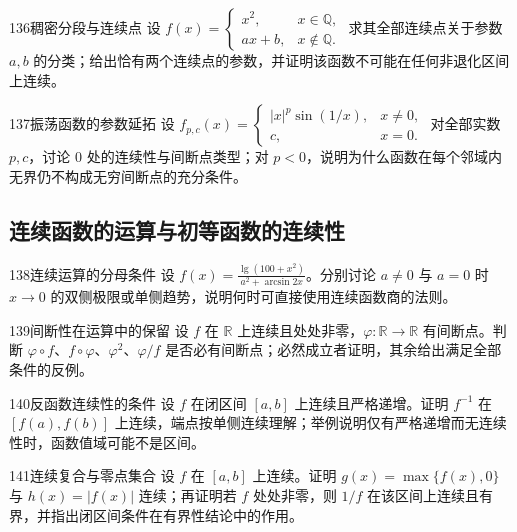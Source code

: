 \begin{exercise}{136}{稠密分段与连续点}
设 $f(x)=\begin{cases}x^2,&x\in\mathbb Q,\\ax+b,&x\notin\mathbb Q.\end{cases}$ 求其全部连续点关于参数 $a,b$ 的分类；给出恰有两个连续点的参数，并证明该函数不可能在任何非退化区间上连续。
\end{exercise}
\begin{exercise}{137}{振荡函数的参数延拓}
设 $f_{p,c}(x)=\begin{cases}|x|^p\sin(1/x),&x\ne0,\\c,&x=0.\end{cases}$ 对全部实数 $p,c$，讨论 $0$ 处的连续性与间断点类型；对 $p<0$，说明为什么函数在每个邻域内无界仍不构成无穷间断点的充分条件。
\end{exercise}
\subsection{连续函数的运算与初等函数的连续性}
\begin{exercise}{138}{连续运算的分母条件}
设 $f(x)=\frac{\lg(100+x^2)}{a^2+\arcsin2x}$。分别讨论 $a\ne0$ 与 $a=0$ 时 $x\to0$ 的双侧极限或单侧趋势，说明何时可直接使用连续函数商的法则。
\end{exercise}
\begin{exercise}{139}{间断性在运算中的保留}
设 $f$ 在 $\mathbb R$ 上连续且处处非零，$\varphi:\mathbb R\to\mathbb R$ 有间断点。判断 $\varphi\circ f$、$f\circ\varphi$、$\varphi^2$、$\varphi/f$ 是否必有间断点；必然成立者证明，其余给出满足全部条件的反例。
\end{exercise}
\begin{exercise}{140}{反函数连续性的条件}
设 $f$ 在闭区间 $[a,b]$ 上连续且严格递增。证明 $f^{-1}$ 在 $[f(a),f(b)]$ 上连续，端点按单侧连续理解；举例说明仅有严格递增而无连续性时，函数值域可能不是区间。
\end{exercise}
\begin{exercise}{141}{连续复合与零点集合}
设 $f$ 在 $[a,b]$ 上连续。证明 $g(x)=\max\{f(x),0\}$ 与 $h(x)=|f(x)|$ 连续；再证明若 $f$ 处处非零，则 $1/f$ 在该区间上连续且有界，并指出闭区间条件在有界性结论中的作用。
\end{exercise}
